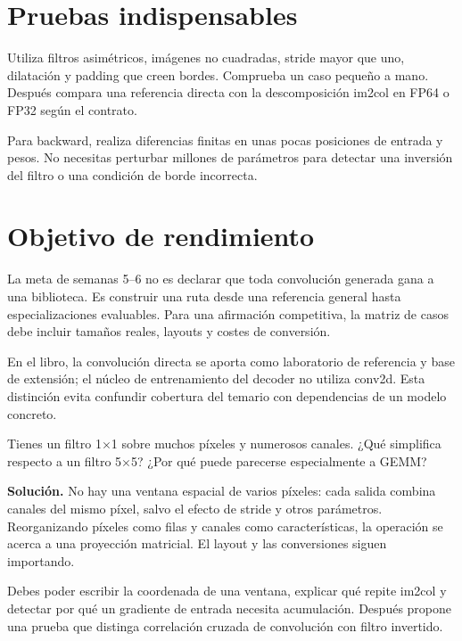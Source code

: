 \documentclass[12pt,a4paper,oneside]{report}
\begin{document}
\section{Pruebas indispensables}
Utiliza filtros asimétricos, imágenes no cuadradas, stride mayor que uno, dilatación y padding que creen bordes. Comprueba un caso pequeño a mano. Después compara una referencia directa con la descomposición im2col en FP64 o FP32 según el contrato.

Para backward, realiza diferencias finitas en unas pocas posiciones de entrada y pesos. No necesitas perturbar millones de parámetros para detectar una inversión del filtro o una condición de borde incorrecta.

\section{Objetivo de rendimiento}
La meta de semanas 5--6 no es declarar que toda convolución generada gana a una biblioteca. Es construir una ruta desde una referencia general hasta especializaciones evaluables. Para una afirmación competitiva, la matriz de casos debe incluir tamaños reales, layouts y costes de conversión.

En el libro, la convolución directa se aporta como laboratorio de referencia y base de extensión; el núcleo de entrenamiento del decoder no utiliza conv2d. Esta distinción evita confundir cobertura del temario con dependencias de un modelo concreto.

\begin{practica}
Tienes un filtro 1\ensuremath{\times}1 sobre muchos píxeles y numerosos canales. ¿Qué simplifica respecto a un filtro 5\ensuremath{\times}5? ¿Por qué puede parecerse especialmente a GEMM?

\end{practica}
\textbf{Solución.} No hay una ventana espacial de varios píxeles: cada salida combina canales del mismo píxel, salvo el efecto de stride y otros parámetros. Reorganizando píxeles como filas y canales como características, la operación se acerca a una proyección matricial. El layout y las conversiones siguen importando.

\begin{comprueba}
Debes poder escribir la coordenada de una ventana, explicar qué repite im2col y detectar por qué un gradiente de entrada necesita acumulación. Después propone una prueba que distinga correlación cruzada de convolución con filtro invertido.

\end{comprueba}
\end{document}
